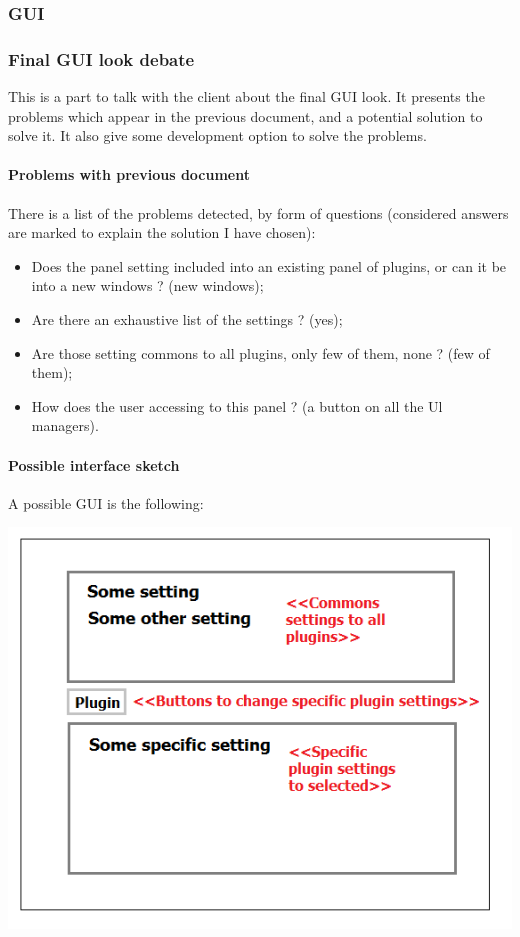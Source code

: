 \subsubsection{GUI}

\subsubsection*{Final GUI look debate}

This is a part to talk with the client about the final GUI look. It presents the problems which appear in the previous document, and a potential solution to solve it. It also give some development option to solve the problems.

\paragraph*{Problems with previous document}

There is a list of the problems detected, by form of questions (considered answers are marked to explain the solution I have chosen):
\begin{itemize}
	\item Does the panel setting included into an existing panel of plugins, or can it be into a new windows ? (new windows);
	\item Are there an exhaustive list of the settings ? (yes);
	\item Are those setting commons to all plugins, only few of them, none ? (few of them);
	\item How does the user accessing to this panel ? (a button on all the Ul managers).
\end{itemize}

\paragraph*{Possible interface sketch}

A possible GUI is the following:

\includegraphics[width=\linewidth]{images/GUI0.png}


